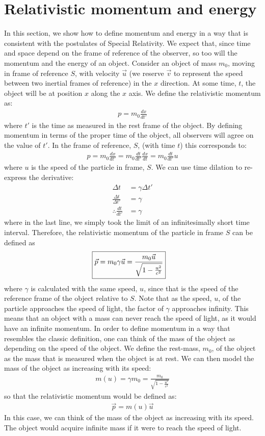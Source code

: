 \section{Relativistic momentum and energy}
In this section, we show how to define momentum and energy in a way that is consistent with the postulates of Special Relativity. We expect that, since time and space depend on the frame of reference of the observer, so too will the momentum and the energy of an object. Consider an object of mass $m_0$, moving in frame of reference $S$, with velocity $\vec u$ (we reserve $\vec v$ to represent the speed between two inertial frames of reference) in the $x$ direction. At some time, $t$, the object will be at position $x$ along the $x$ axis. We define the relativistic momentum as:
\begin{align*}
p = m_0\frac{dx}{dt'}
\end{align*}
where $t'$ is the time as measured in the rest frame of the object. By defining momentum in terms of the proper time of the object, all observers will agree on the value of $t'$. In the frame of reference, $S$, (with time $t$) this corresponds to:
\begin{align*}
p = m_0\frac{dx}{dt'}=m_0\frac{dt}{dt'}\frac{dx}{dt}=m_0\frac{dt}{dt'}u
\end{align*}
where $u$ is the speed of the particle in frame, $S$. We can use time dilation to re-express the derivative:
\begin{align*}
\Delta t &= \gamma \Delta t'\\
\frac{\Delta t}{\Delta t'}&=\gamma\\
\therefore \frac{dt}{dt'}&=\gamma
\end{align*}
where in the last line, we simply took the limit of an infinitesimally short time interval. Therefore, the relativistic momentum of the particle in frame $S$ can be defined as
\begin{align*}
\Aboxed{\vec p = m_0\gamma\vec u =  \frac{m_0\vec u}{\sqrt{1-\frac{u^2}{c^2}}} }
\end{align*}
where $\gamma$ is calculated with the same speed, $u$, since that is the speed of the reference frame of the object relative to $S$. Note that as the speed, $u$, of the particle approaches the speed of light, the factor of $\gamma$ approaches infinity. This means that an object with a mass can never reach the speed of light, as it would have an infinite momentum. In order to define momentum in a way that resembles the classic definition, one can think of the mass of the object as depending on the speed of the object. We define the rest-mass, $m_0$, of the object as the mass that is measured when the object is at rest. We can then model the mass of the object as increasing with its speed:
\begin{align*}
m(u) = \gamma m_0 = \frac{m_0}{\sqrt{1-\frac{u^2}{c^2}}}
\end{align*}
so that the relativistic momentum would be defined as:
\begin{align*}
\vec p = m(u)\vec u
\end{align*}
In this case, we can think of the mass of the object as increasing with its speed. The object would acquire infinite mass if it were to reach the speed of light.

